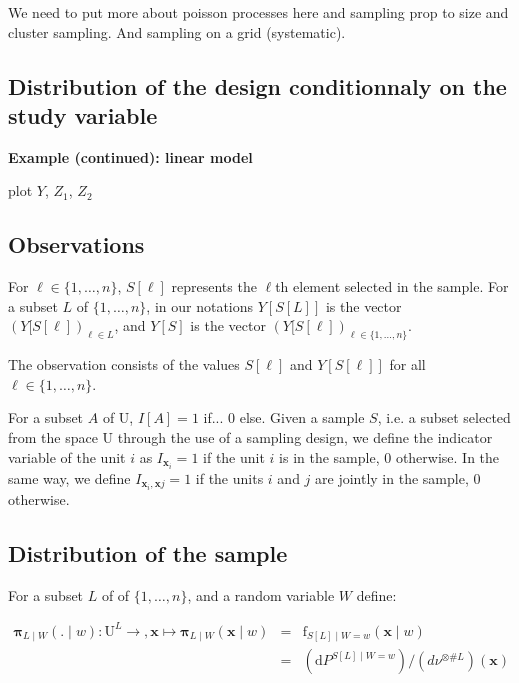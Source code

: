 \documentclass[12pt]{article}
\theoremstyle{definition}
\theoremstyle{remark}
\newcommand{\dominantU}{\nu}
\newcommand{\sampledensity}{\mathbf{\pi}}
\newcommand{\density}{\mathrm{f}}
\newcommand{\Sample}{S}
\newcommand{\Pop}{\mathrm{U}}
\newcommand{\position}{\mathbf{x}}
\newcommand{\Sampleindex}{L}
\newcommand{\Signal}{Y}
\begin{document}
We need to put more about poisson processes here and sampling prop to size and cluster sampling. And sampling on a grid (systematic).

\subsection{Distribution of the design conditionnaly on the study variable}

{\bf Example (continued): linear model}

{\color{red} plot $Y$, $Z_1$, $Z_2$ }  

\subsection{Observations}
For $\ell\in\{1,\ldots,n\}$, $\Sample[\ell]$  represents the $\ell$th element selected in the sample. For a subset $\Sampleindex$ of $\{1,\ldots, n\}$, in our notations $\Signal[\Sample[\Sampleindex]]$ is the vector $(\Signal[\Sample[\ell])_{\ell \in \Sampleindex}$, and $\Signal[\Sample]$ is the vector $(\Signal[\Sample[\ell])_{\ell \in \{1,\ldots,n\}}$.

The observation consists of the values $\Sample[\ell]$ and $\Signal[\Sample[\ell]]$ for all $\ell\in\{1,\ldots,n\}$.

For a subset $A$ of $\Pop$, $I[A]=1 $ if... 0 else.
Given a sample $\Sample$, i.e. a subset selected from the space $\Pop$ through the use of a sampling design, we define the indicator variable of the unit $i$ as $I_{\position_{i}}=1$ if the unit $i$ is in the sample, 0 otherwise. In the same way, we define  $I_{\position_{i},\position{j}}=1$ if the units $i$ and $j$ are jointly in the sample, 0 otherwise. 


\subsection{Distribution of the sample}

For a subset $\Sampleindex$ of of $\{1,\ldots,n\}$, and a random variable $W$ define:

\begin{eqnarray}
\sampledensity_{\Sampleindex\mid W}(.\mid w):\Pop^{\Sampleindex}\to, \position\mapsto \sampledensity_{\Sampleindex\mid W}(\position\mid w)&=&
\density_{\Sample[\Sampleindex]\mid W=w}(\position\mid w)\\&=&
(\mathrm{d}P^{\Sample[\Sampleindex]\mid W=w})/(d\dominantU^{\otimes \#\Sampleindex})(\position)
\end{eqnarray}
\end{document}

